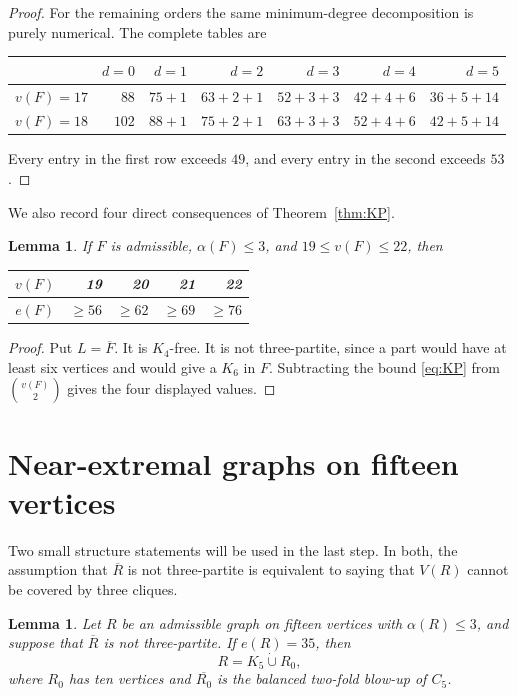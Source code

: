 \documentclass[11pt,reqno,a4paper]{amsart}
\newtheorem{lemma}[theorem]{Lemma}
\theoremstyle{definition}
\theoremstyle{remark}
\newcommand{\comp}[1]{\overline{#1}}
\begin{document}
\begin{proof}
For the remaining orders the same minimum-degree decomposition is purely
numerical.  The complete tables are
\begin{center}\small
\begin{tabular}{c@{\quad}rrrrrr}
\toprule
& $d=0$ & $d=1$ & $d=2$ & $d=3$ & $d=4$ & $d=5$\\
\midrule
$v(F)=17$ & $88$ & $75+1$ & $63+2+1$ & $52+3+3$
            & $42+4+6$ & $36+5+14$\\
$v(F)=18$ & $102$ & $88+1$ & $75+2+1$ & $63+3+3$
            & $52+4+6$ & $42+5+14$\\
\bottomrule
\end{tabular}
\end{center}
Every entry in the first row exceeds $49$, and every entry in the second
exceeds $53$.
\end{proof}

We also record four direct consequences of Theorem~\ref{thm:KP}.

\begin{lemma}\label{lem:alpha3-large}
If $F$ is admissible, $\alpha(F)\leq3$, and $19\leq v(F)\leq22$, then
\begin{center}
\begin{tabular}{c@{\qquad}rrrr}
\toprule
$v(F)$ & 19 & 20 & 21 & 22\\
\midrule
$e(F)$ & $\geq56$ & $\geq62$ & $\geq69$ & $\geq76$\\
\bottomrule
\end{tabular}
\end{center}
\end{lemma}

\begin{proof}
Put $L=\comp F$.  It is $K_4$-free.  It is not three-partite, since a part
would have at least six vertices and would give a $K_6$ in $F$.  Subtracting
the bound \eqref{eq:KP} from $\binom{v(F)}2$ gives the four displayed
values.
\end{proof}

\section{Near-extremal graphs on fifteen vertices}\label{sec:fifteen}

Two small structure statements will be used in the last step.  In both,
the assumption that $\comp R$ is not three-partite is equivalent to saying
that $V(R)$ cannot be covered by three cliques.

\begin{lemma}\label{lem:fifteen-35}
Let $R$ be an admissible graph on fifteen vertices with $\alpha(R)\leq3$,
and suppose that $\comp R$ is not three-partite.  If $e(R)=35$, then
\[
  R=K_5\mathbin{\dot\cup}R_0,
\]
where $R_0$ has ten vertices and $\comp{R_0}$ is the balanced two-fold
blow-up of $C_5$.
\end{lemma}
\end{document}
